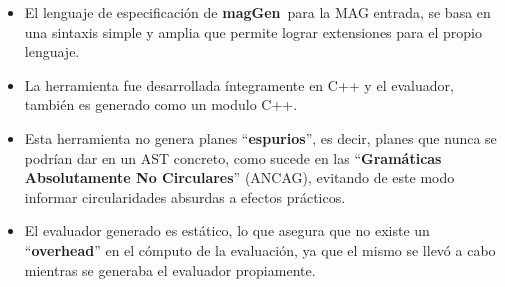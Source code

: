 \documentclass[runningheads,a4paper]{llncs}
\newcommand{\maggen}{\textbf{magGen}}
\begin{document}
\begin{itemize}
\item El lenguaje de especificación de \maggen\ para la MAG entrada, se basa en una sintaxis simple y amplia que permite lograr extensiones para el propio lenguaje.

\item La herramienta fue desarrollada íntegramente en C++ y el evaluador, también es generado como un modulo C++. 

\item Esta herramienta no genera planes ``\textbf{espurios}'', es decir, planes que nunca se podrían dar en un AST concreto, como sucede en las ``\textbf{Gramáticas Absolutamente No Circulares}'' (ANCAG), evitando de este modo informar circularidades absurdas a efectos prácticos.

\item El evaluador generado es estático, lo que asegura que no existe un ``\textbf{overhead}'' en el cómputo de la evaluación, ya que el mismo se llevó a cabo mientras se generaba el evaluador propiamente.
\end{itemize}
\end{document}
